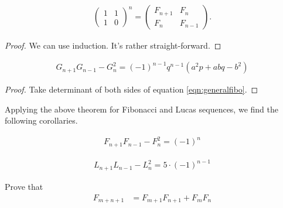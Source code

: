 \documentclass{subfile}
\begin{document}
\begin{corollary}
\begin{align*}
\begin{pmatrix}
1 & 1\\
1 & 0
\end{pmatrix}^n=
\begin{pmatrix}
F_{n+1} & F_{n}\\
F_n & F_{n-1}
\end{pmatrix}.
\end{align*}
\end{corollary}

\begin{proof}
We can use induction. It's rather straight-forward.
\end{proof}

\begin{theorem}\slshape
\begin{align*}
G_{n+1}G_{n-1}-G_n^2=(-1)^{n-1}q^{n-1}\left(a^2p+abq-b^2\right)
\end{align*}
\end{theorem}

\begin{proof}
Take determinant of both sides of equation \eqref{eqn:generalfibo}.
\end{proof}
Applying the above theorem for Fibonacci and Lucas sequences, we find the following corollaries.
\begin{corollary}
\begin{align*}
F_{n+1}F_{n-1}-F_n^2=(-1)^n
\end{align*}
\end{corollary}

\begin{corollary}
\begin{align*}
L_{n+1}L_{n-1}-L_n^2=5\cdot(-1)^{n-1}
\end{align*}
\end{corollary}

\begin{problem}
Prove that
	\begin{align}
	F_{m+n+1}
		& =F_{m+1}F_{n+1}+F_mF_n
	\end{align}
\end{problem}
\end{document}
